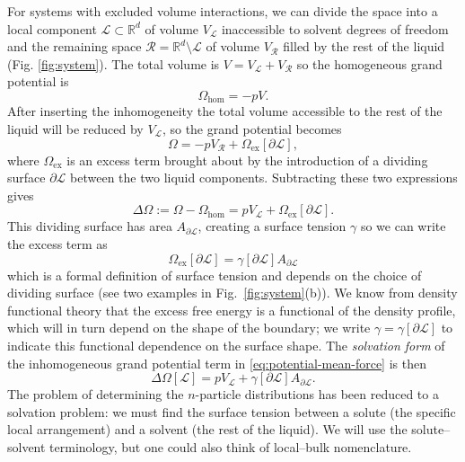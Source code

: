 \documentclass[11pt,twoside]{report}
\begin{document}
For systems with excluded volume interactions, we can divide the space into a local component $\mathcal{L} \subset \mathbb{R}^d$ of volume $V_\mathcal{L}$ inaccessible to solvent degrees of freedom and the remaining space $\mathcal{R} = \mathbb{R}^d \setminus \mathcal{L}$ of volume $V_\mathcal{R}$ filled by the rest of the liquid (Fig. \ref{fig:system}).
The total volume is $V = V_\mathcal{L} + V_\mathcal{R}$ so the homogeneous grand potential is
\begin{equation*}
  \Omega_\mathrm{hom} = -p V.
\end{equation*}
After inserting the inhomogeneity the total volume accessible to the rest of the liquid will be reduced by $V_\mathcal{L}$, so the grand potential becomes
\begin{equation*}
  \Omega = -p V_\mathcal{R} + \Omega_\mathrm{ex}[\partial\mathcal{L}],
\end{equation*}
where $\Omega_\mathrm{ex}$ is an excess term brought about by the introduction of a dividing surface $\partial\mathcal{L}$ between the two liquid components.
Subtracting these two expressions gives
\begin{equation*}
  \Delta \Omega
  := \Omega - \Omega_\mathrm{hom}
  = p V_\mathcal{L} + \Omega_\mathrm{ex}[\partial\mathcal{L}].
\end{equation*}
This dividing surface has area $A_{\partial\mathcal{L}}$, creating a surface tension $\gamma$ so we can write the excess term as
\begin{equation*}
  \Omega_\mathrm{ex}[\partial\mathcal{L}] =
  \gamma[\partial\mathcal{L}] A_{\partial\mathcal{L}}
\end{equation*}
which is a formal definition of surface tension and depends on the choice of dividing surface (see two examples in Fig.\ \ref{fig:system}(b)).
We know from density functional theory \cite{EvansAP1979} that the excess free energy is a functional of the density profile, which will in turn depend on the shape of the boundary; we write $\gamma = \gamma[\partial \mathcal{L}]$ to indicate this functional dependence on the surface shape.
The \emph{solvation form} of the inhomogeneous grand potential term in \eqref{eq:potential-mean-force} is then
\begin{equation}\label{eq:surface-tension}
  \Delta \Omega[\mathcal{L}] =
  p V_\mathcal{L} + \gamma[{\partial\mathcal{L}}] A_{\partial\mathcal{L}}.
\end{equation}
The problem of determining the $n$-particle distributions has been reduced to a solvation problem: we must find the surface tension between a solute (the specific local arrangement) and a solvent (the rest of the liquid).
We will use the solute--solvent terminology, but one could also think of local--bulk nomenclature.
\end{document}
